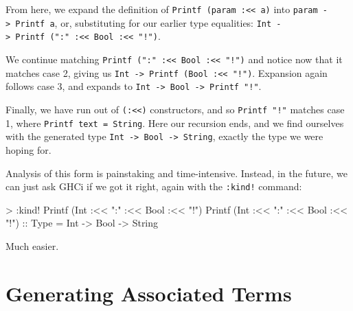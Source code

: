 \documentclass[
  11pt,
]{book}
\newenvironment{Shaded}{}{}
\newcommand{\DataTypeTok}[1]{\textcolor[rgb]{0.56,0.13,0.00}{#1}}
\newcommand{\NormalTok}[1]{#1}
\newcommand{\OperatorTok}[1]{\textcolor[rgb]{0.40,0.40,0.40}{#1}}
\newcommand{\OtherTok}[1]{\textcolor[rgb]{0.00,0.44,0.13}{#1}}
\newcommand{\StringTok}[1]{\textcolor[rgb]{0.25,0.44,0.63}{#1}}
\theoremstyle{nonumberplain}
\begin{document}
From here, we expand the definition of
\texttt{Printf\ (param\ :\textless{}\textless{}\ a)} into
\texttt{param\ -\textgreater{}\ Printf\ a}, or, substituting for our
earlier type equalities:
\texttt{Int\ -\textgreater{}\ Printf\ (":"\ :\textless{}\textless{}\ Bool\ :\textless{}\textless{}\ "!")}.

We continue matching
\texttt{Printf\ (":"\ :\textless{}\textless{}\ Bool\ :\textless{}\textless{}\ "!")}
and notice now that it matches case 2, giving us
\texttt{Int\ -\textgreater{}\ Printf\ (Bool\ :\textless{}\textless{}\ "!")}.
Expansion again follows case 3, and expands to
\texttt{Int\ -\textgreater{}\ Bool\ -\textgreater{}\ Printf\ "!"}.

Finally, we have run out of \texttt{(:\textless{}\textless{})}
constructors, and so \texttt{Printf\ "!"} matches case 1, where
\texttt{Printf\ text\ =\ String}. Here our recursion ends, and we find
ourselves with the generated type
\texttt{Int\ -\textgreater{}\ Bool\ -\textgreater{}\ String}, exactly
the type we were hoping for.

Analysis of this form is painstaking and time-intensive. Instead, in the
future, we can just ask GHCi if we got it right, again with the
\texttt{:kind!} command:

\begin{Shaded}
\begin{Highlighting}[]
\OperatorTok{\textgreater{}} \OperatorTok{:}\NormalTok{kind}\OperatorTok{!} \DataTypeTok{Printf}\NormalTok{ (}\DataTypeTok{Int} \OperatorTok{:\textless{}\textless{}} \StringTok{":"} \OperatorTok{:\textless{}\textless{}} \DataTypeTok{Bool} \OperatorTok{:\textless{}\textless{}} \StringTok{"!"}\NormalTok{)}
\DataTypeTok{Printf}\NormalTok{ (}\DataTypeTok{Int} \OperatorTok{:\textless{}\textless{}} \StringTok{":"} \OperatorTok{:\textless{}\textless{}} \DataTypeTok{Bool} \OperatorTok{:\textless{}\textless{}} \StringTok{"!"}\NormalTok{)}\OtherTok{ ::} \DataTypeTok{Type}
\OtherTok{=} \DataTypeTok{Int} \OtherTok{{-}\textgreater{}} \DataTypeTok{Bool} \OtherTok{{-}\textgreater{}} \DataTypeTok{String}
\end{Highlighting}
\end{Shaded}

Much easier.

\hypertarget{generating-associated-terms}{%
\section{Generating Associated
Terms}\label{generating-associated-terms}}
\end{document}
